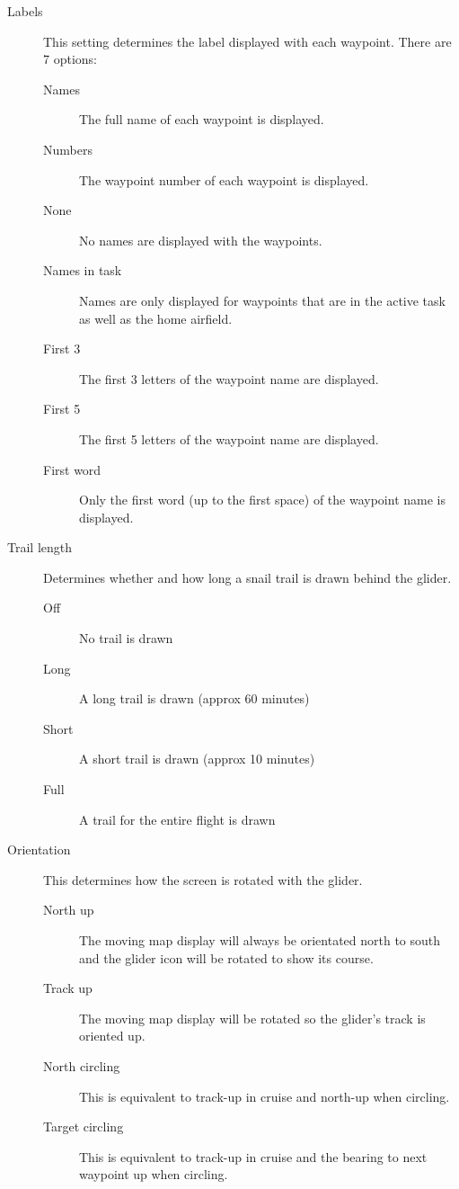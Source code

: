\documentclass[a4paper,12pt]{refrep}
\begin{document}
\begin{description}
\item[Labels] This setting determines the label displayed with each waypoint. There are 7 options:


\begin{description}
\item[Names] The full name of each waypoint is displayed.
\item[Numbers] The waypoint number of
each waypoint is displayed.
\item[None] No names are displayed with the waypoints.
\item[Names in task] Names are only displayed for waypoints that are in the active task as well as the home airfield.
\item[First 3] The first 3 letters of the waypoint name are displayed.
\item[First 5] The first 5 letters of the waypoint name are displayed.
\item[First word] Only the first word (up to the first space) of the waypoint name is displayed.
\end{description}
\item[Trail length] Determines whether and how long a snail trail is drawn behind the glider.
\begin{description}
\item[Off] No trail is drawn
\item[Long] A long trail is drawn (approx 60 minutes)
\item[Short] A short trail is drawn (approx 10 minutes) 
\item[Full] A trail for the entire flight is drawn
\end{description}
\item[Orientation]  This determines how the screen is rotated with the glider.
\begin{description}
\item[North up] The moving map display will always be orientated north to south and the glider icon 
will be rotated to show its course.
\item[Track up] The moving map display will be rotated so the glider's track
 is oriented up.
\item[North circling] This is equivalent to track-up in cruise and north-up when circling.
\item[Target circling] This is equivalent to track-up in cruise and the bearing to next waypoint up 
when circling.

\end{description}
\end{description}
\end{document}
